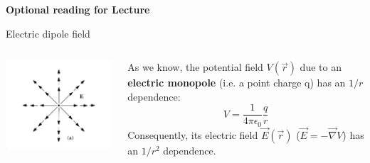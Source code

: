 
%
%

\begin{frame}[plain,c]
\begin{center}
{\Huge \bf Optional reading for Lecture \thislecture}
\end{center}
\end{frame}


%
%
%

\begin{frame}{Electric dipole field}

\begin{columns}
  \begin{column}{0.20\textwidth}
   \begin{center}
     \includegraphics[width=0.99\textwidth]{./images/schematics/electric_field_pos_point_charge.png}\\
   \end{center}
  \end{column}
  \begin{column}{0.80\textwidth}
     As we know, the potential field $V(\vec{r})$ due to an
     {\bf electric monopole} (i.e. a point charge q) has an $1/r$ dependence:
     \begin{equation*}
         V = \frac{1}{4\pi\epsilon_0} \frac{q}{r}
     \end{equation*}
     Consequently, its electric field $\vec{E}(\vec{r})$ ($\vec{E} = -\vec{\nabla}V$)
     has an $1/r^2$ dependence.
  \end{column}
\end{columns}


\end{frame}

